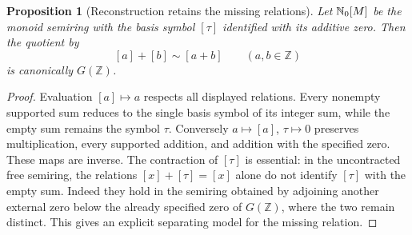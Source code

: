 \documentclass[11pt,a4paper]{article}
\newtheorem{proposition}[theorem]{Proposition}
\theoremstyle{definition}\newtheorem{definition}[theorem]{Definition}
\newcommand{\Z}{\mathbb Z}\newcommand{\Q}{\mathbb Q}
\begin{document}
\begin{proposition}[Reconstruction retains the missing relations]\label{prop:preaddition-rebuild}
Let $\mathbb N_0[M]$ be the monoid semiring with the basis symbol $[\tau]$ identified with its additive zero. Then the quotient by
\[
 [a]+[b]\sim[a+b]\qquad(a,b\in\Z)
\]
is canonically $G(\Z)$.
\end{proposition}
\begin{proof}
Evaluation $[a]\mapsto a$ respects all displayed relations. Every nonempty supported sum reduces to the single basis symbol of its integer sum, while the empty sum remains the symbol $\tau$. Conversely $a\mapsto[a]$, $\tau\mapsto0$ preserves multiplication, every supported addition, and addition with the specified zero. These maps are inverse. The contraction of $[\tau]$ is essential: in the uncontracted free semiring, the relations $[x]+[\tau]=[x]$ alone do not identify $[\tau]$ with the empty sum. Indeed they hold in the semiring obtained by adjoining another external zero below the already specified zero of $G(\Z)$, where the two remain distinct. This gives an explicit separating model for the missing relation.
\end{proof}
\end{document}

